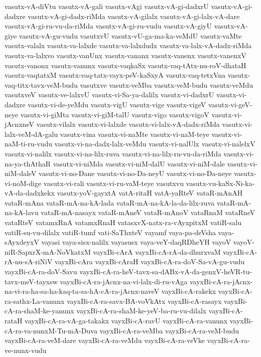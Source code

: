 {vasutx-vA-diVtu
vasutx-vA-gali
vasutx-vAgi
vasutx-vA-gi-dadxrU
vasutx-vA-gi-dadxre
vasutx-vA-gi-dadx-riMda
vasutx-vA-gilalx
vasutx-vA-gi-lalx-vA-dare
vasutx-vA-gi-ru-vu-da-riMda
vasutx-vA-gi-ru-vudu
vasutx-vA-giyU
vasutx-vA-giye
vasutx-vA-gu-vudu
vasutxvU
vasutx-vU-ga-ma-ka-veMdU
vasutx-vaMte
vasutx-valalx
vasutx-va-lalxde
vasutx-va-lalxdudx
vasutx-va-lalx-vA-dadx-riMda
vasutx-va-lalxvo
vasutx-vanUnx
vasutx-vananx
vasutx-vanenx
vasutx-vanenxV
vasutx-vanonx
vasutx-vanunx
vasutx-vaqkaSx
vasutx-vaq-tAtx-nu-roV-dhataH
vasutx-vaqtatxM
vasutx-vaq-tatx-vayx-peV-kaSxyA
vasutx-vaq-tetxVna
vasutx-vaq-titx-tavx-veM-budu
vasutxve
vasutx-veMba
vasutx-veM-budu
vasutx-veMdu
vasutxveV
vasutx-ve-lalxvU
vasutx-vi-Sa-ya-dalilx
vasutx-vi-dadxrU
vasutx-vi-dadxre
vasutx-vi-de-yeMdu
vasutx-vigU
vasutx-vige
vasutx-vigeV
vasutx-vi-geV-neye
vasutx-vi-giMta
vasutx-vi-giM-talU
vasutx-vigo
vasutx-vigoV
vasutx-vi-jAcnxneV
vasutx-vilalx
vasutx-vi-lalxde
vasutx-vi-lalx-vA-dadx-riMda
vasutx-vi-lalx-veM-dA-galu
vasutx-vina
vasutx-vi-naMte
vasutx-vi-naM-teye
vasutx-vi-naM-ti-ru-vudu
vasutx-vi-na-dadx-lalx-veMdu
vasutx-vi-nalUlx
vasutx-vi-nalelxV
vasutx-vi-nalilx
vasutx-vi-na-lilx-ruva
vasutx-vi-na-lilx-ru-vu-da-riMda
vasutx-vi-na-ya-thAthaR
vasutx-vi-niMda
vasutx-vi-niM-dalU
vasutx-vi-niM-dale
vasutx-vi-niM-daleV
vasutx-vi-no-Dane
vasutx-vi-no-Da-neyU
vasutx-vi-no-Da-neye
vasutx-vi-noM-dige
vasutx-vi-rali
vasutx-vi-ru-vaM-teye
vasutxvu
vasutx-vu-kaSx-Ni-ka-vA-da-dadxkekx
vasutx-yoV-gayxtA
vatA-ritaH
vatA-yaRteV
vataR-mAnAH
vataR-mAna
vataR-mA-na-kA-lada
vataR-mA-na-kA-la-da-lilx-ruva
vataR-mA-na-kA-lavu
vataR-mA-nasayx
vataR-mAneV
vataR-mAnoV
vataRnaM
vataRneV
vataRteV
vatamxRnA
vatamxRnaH
vatasxvX-natx-ra-vAyxpitxM
vatiR-salu
vatiR-su-vu-dilalx
vatiR-tumf
vati-SaThxteV
vayamf
vaya-pa-deVsha
vaya-sAyxdeyxV
vayasi
vaya-sisx-nalilx
vayasusx
vaya-veY-daqRDheYH
vayoV
vayoV-niR-SapxrX-mA-NoVkatxM
vayxBi-cArA
vayxBi-cA-rA-da-dhurxvaM
vayxBi-cA-rA-nu-sA-riNiV
vayxBi-cAra
vayxBi-cAraH
vayxBi-cA-ra-doV-Sa-vA-gu-vudu
vayxBi-cA-ra-doV-Savu
vayxBi-cA-ra-heV-tavx-sa-dABx-vA-da-genxV-heVR-tu-tavx-meV-tayxsw
vayxBi-cA-ra-jAcnx-na-vi-lalx-di-ru-vAga
vayxBi-cA-ra-jAcnx-na-vi-ra-ha-sa-ha-kaq-ta-sa-hA-cA-ra-jAcnx-naveV
vayxBi-cA-rakekx
vayxBi-cA-ra-sathx-La-vanunx
vayxBi-cA-ra-savx-BA-voVkAtx
vayxBi-cA-rasayx
vayxBi-cA-ra-shaM-ke-yanunx
vayxBi-cA-ra-shaM-ke-yeV-ba-ru-vu-dilalx
vayxBi-cA-rataH
vayxBi-cA-ra-vA-ga-takakx
vayxBi-cA-ravU
vayxBi-cA-ra-vanunx
vayxBi-cA-ra-va-nunxM-Tu-mA-Duva
vayxBi-cA-ra-veMba
vayxBi-cA-ra-veM-budu
vayxBi-cA-ra-veM-dare
vayxBi-cA-ra-veMdu
vayxBi-cA-ra-veVke
vayxBi-cA-ra-ve-nunx-vudu
}

